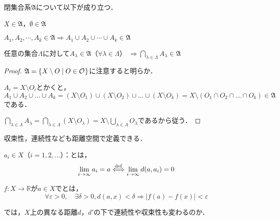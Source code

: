 \documentclass[uplatex]{jsarticle}
\begin{document}
\begin{prop}
    閉集合系$\mathfrak{A}$について以下が成り立つ．
    
     $X \in \mathfrak{A}$，$\emptyset \in \mathfrak{A}$

     $A_{1}, A_{2}, \cdots, A_{k} \in \mathfrak{A} \Longrightarrow A_{1} \cup A_{2} \cup \cdots \cup A_{k} \in \mathfrak{A}$

     任意の集合$\Lambda$に対して$A_{\lambda} \in \mathfrak{A}$（$\forall \lambda \in \Lambda$） ${\displaystyle \Longrightarrow \bigcap_{\lambda \in \Lambda} A_{\lambda} \in \mathfrak{A}}$
\end{prop}

\begin{proof}
     $\mathfrak{A} = \Set{\hspace{-1.8pt}  X \setminus O | O \in \mathcal{O} \hspace{-1.8pt}}$に注意すると明らか．

     $A_{i} = X \setminus O_{i}$とかくと，
    \begin{equation}
        A_{1} \cup A_{2} \cup \dots \cup A_{k}
        = (X \setminus O_{1}) \cup (X \setminus O_{2}) \cup \dots \cup (X \setminus O_{k})
        = X \setminus (O_{1} \cap O_{2} \cap \dots \cap O_{k}) \in \mathfrak{A}
    \end{equation}
    である．

     ${\displaystyle \bigcap_{\lambda \in \Lambda} A_{\lambda} = \bigcap_{\lambda \in \Lambda} (X \setminus O_{\lambda}) = X \setminus \bigcup_{\lambda \in \Lambda} O_{\lambda}}$であるから従う．
\end{proof}

収束性，連続性なども距離空間で定義できる．

\begin{teigi}
     $a_{i} \in X$（$i=1,2,\dots$）：とは，
    \begin{equation}
        \lim_{i \to \infty} a_{i} = a \overset{\mathrm{def}}{\Longleftrightarrow} \lim_{i \to \infty} d(a, a_{i}) = 0
    \end{equation}
    
     $f:X \longrightarrow \mathbb{R}$が$a \in X$でとは，
    \begin{equation}
        \forall \varepsilon > 0, \quad \exists \delta > 0, d(a,x) < \delta \Longrightarrow \left| f(a) - f(x) \right| < \varepsilon
    \end{equation}
\end{teigi}

では，$X$上の異なる距離$d$，$d'$の下で連続性や収束性も変わるのか．
\end{document}
